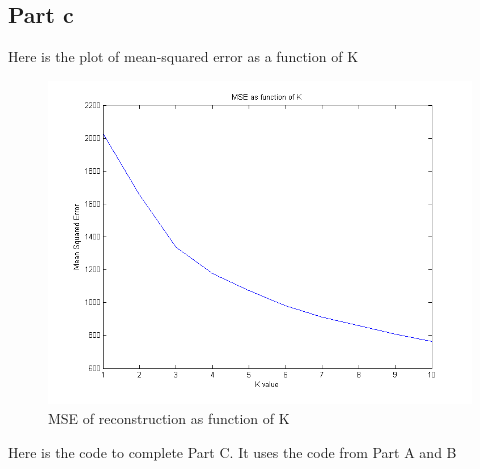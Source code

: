 \documentclass[twoside,11pt]{article}
\theoremstyle{definition}
\begin{document}
\newpage

\subsection*{Part c}

Here is the plot of mean-squared error as a function of K
\begin{figure}[h]
\centering
\includegraphics[width=6 in]{prob3PartC.png}
\caption{MSE of reconstruction as function of K}
\end{figure}

Here is the code to complete Part C. It uses the code from Part A and B


\newpage
\end{document}
